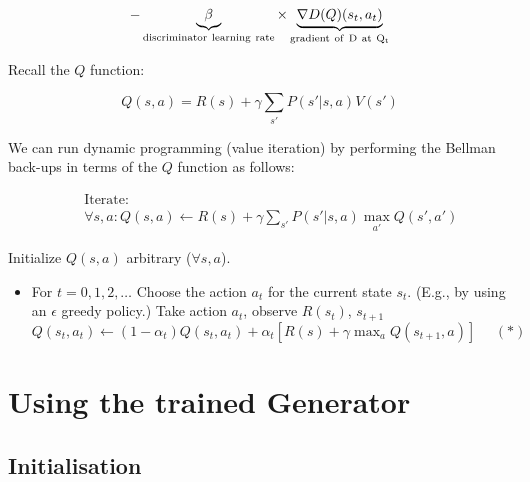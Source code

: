    \[- \underbrace{\beta}_{\rm discriminator~learning~rate} \times \underbrace{\nabla D(Q)(s_{t}, a_{t})}_{\rm gradient~of~D~at~Q_{t}} \]




Recall the $Q$ function:

\begin{equation*}
Q(s,a) = R(s) + \gamma \sum_{s'}P(s'|s,a)V(s')
\end{equation*}

We can run dynamic programming (value iteration) by performing the
Bellman back-ups in terms of the $Q$ function as follows:

\begin{eqnarray*}
&& \mbox{Iterate: } \\
&& \forall s, a: Q(s,a) \leftarrow R(s) + \gamma \sum_{s'} P(s'|s,a) \max_{a'} Q(s',a')
\end{eqnarray*}



Initialize $Q(s,a)$ arbitrary ($\forall s, a$). 
\begin{itemize}
\item For $t = 0, 1, 2, \ldots$
\subitem Choose the action $a_t$ for the current state $s_t$. (E.g., by using an $\epsilon$ greedy policy.)
\subitem Take action $a_t$, observe $R(s_t)$, $s_{t+1}$
\subitem $Q(s_t,a_t) \leftarrow (1-\alpha_t)Q(s_t,a_t) + \alpha_t[R(s) + \gamma \displaystyle \max_{a} \displaystyle{Q(s_{t+1}, a)}] \ \ \ \ \ \ (*)$
\end{itemize}




\section{Using the trained Generator}
\subsection{Initialisation}

